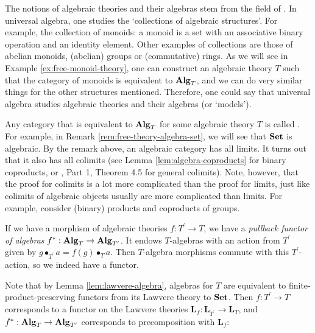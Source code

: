 \begin{remark}
  The notions of algebraic theories and their algebras stem from the field of . In universal algebra, one studies the `collections of algebraic structures'. For example, the collection of monoids: a monoid is a set with an associative binary operation and an identity element. Other examples of collections are those of abelian monoids, (abelian) groups or (commutative) rings. As we will see in Example \ref{ex:free-monoid-theory}, one can construct an algebraic theory $ T $ such that the category of monoids is equivalent to $ \mathbf{Alg}_{T} $, and we can do very similar things for the other structures mentioned. Therefore, one could say that universal algebra studies algebraic theories and their algebras (or `models').

  Any category that is equivalent to $ \mathbf{Alg}_{T} $ for some algebraic theory $ T $ is called . For example, in Remark \ref{rem:free-theory-algebra-set}, we will see that $ \mathbf{Set} $ is algebraic. By the remark above, an algebraic category has all limits. It turns out that it also has all colimits (see Lemma \ref{lem:algebra-coproducts} for binary coproducts, or \autocite{algebraic-theories-2010}, Part 1, Theorem 4.5 for general colimits). Note, however, that the proof for colimits is a lot more complicated than the proof for limits, just like colimits of algebraic objects usually are more complicated than limits. For example, consider (binary) products and coproducts of groups.
\end{remark}

\begin{definition}\label{def:algebra-pullback}
  If we have a morphism of algebraic theories $ f: T^\prime \to T $, we have a \textit{pullback functor of algebras} $ f^* : \mathbf{Alg}_{T} \to \mathbf{Alg}_{T^\prime} $. It endows $ T $-algebras with an action from $ T^\prime $ given by $ g \bullet_{T^\prime} a = f(g) \bullet_T a $. Then $ T $-algebra morphisms commute with this $ T^\prime $-action, so we indeed have a functor.
\end{definition}

\begin{remark}
  Note that by Lemma \ref{lem:lawvere-algebra}, algebras for $ T $ are equivalent to finite-product-preserving functors from its Lawvere theory to $ \mathbf{Set} $. Then $ f: T^\prime \to T $ corresponds to a functor on the Lawvere theories $ \mathbf L_f: \mathbf L_{T^\prime} \to \mathbf L_T $, and $ f^*: \mathbf{Alg}_{T} \to \mathbf{Alg}_{T^\prime} $ corresponds to precomposition with $ \mathbf L_f $:
  \begin{center}
  \end{center}
\end{remark}

